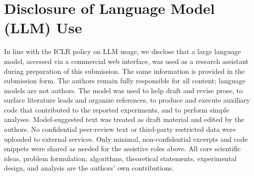 \documentclass{article}
\begin{document}
\section{Disclosure of Language Model (LLM) Use}
\label{app:llm-use}

In line with the ICLR policy on LLM usage, we disclose that a large language model, accessed via a commercial web interface, was used as a research assistant during preparation of this submission. The same information is provided in the submission form. The authors remain fully responsible for all content; language models are not authors.
The model was used to help draft and revise prose, to surface literature leads and organize references, to produce and execute auxiliary code that contributed to the reported experiments, and to perform simple analyses.
Model-suggested text was treated as draft material and edited by the authors.
No confidential peer-review text or third-party restricted data were uploaded to external services. Only minimal, non-confidential excerpts and code snippets were shared as needed for the assistive roles above.
All core scientific ideas, problem formulation, algorithms, theoretical statements, experimental design, and analysis are the authors' own contributions.
\end{document}
